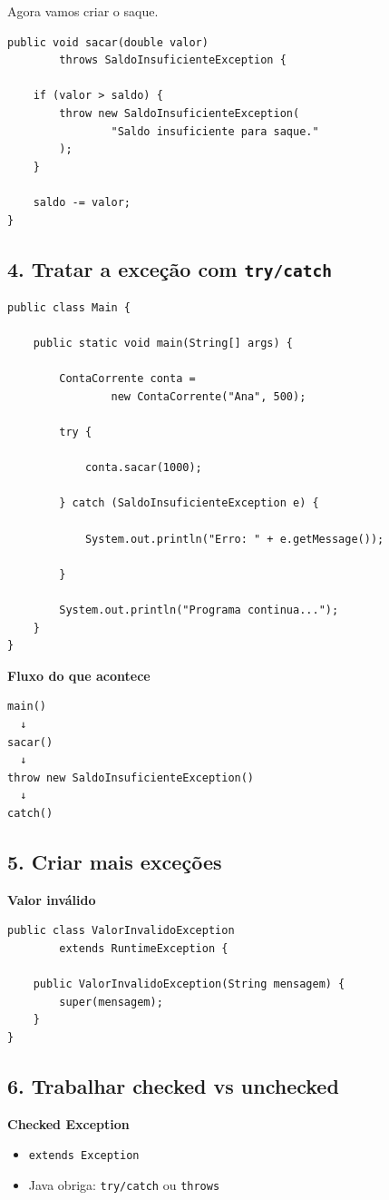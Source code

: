 \documentclass[12pt,a4paper]{article}
\begin{document}
Agora vamos criar o saque.

\begin{lstlisting}
public void sacar(double valor)
        throws SaldoInsuficienteException {

    if (valor > saldo) {
        throw new SaldoInsuficienteException(
                "Saldo insuficiente para saque."
        );
    }

    saldo -= valor;
}
\end{lstlisting}

\subsection*{4. Tratar a exceção com \texttt{try/catch}}
\begin{lstlisting}
public class Main {

    public static void main(String[] args) {

        ContaCorrente conta =
                new ContaCorrente("Ana", 500);

        try {

            conta.sacar(1000);

        } catch (SaldoInsuficienteException e) {

            System.out.println("Erro: " + e.getMessage());

        }

        System.out.println("Programa continua...");
    }
}
\end{lstlisting}

\textbf{Fluxo do que acontece}
\begin{verbatim}
main()
  ↓
sacar()
  ↓
throw new SaldoInsuficienteException()
  ↓
catch()
\end{verbatim}

\subsection*{5. Criar mais exceções}
\textbf{Valor inválido}
\begin{lstlisting}
public class ValorInvalidoException
        extends RuntimeException {

    public ValorInvalidoException(String mensagem) {
        super(mensagem);
    }
}
\end{lstlisting}

\subsection*{6. Trabalhar checked vs unchecked}
\textbf{Checked Exception}
\begin{itemize}
    \item \texttt{extends Exception}
    \item Java obriga: \texttt{try/catch} ou \texttt{throws}
\end{itemize}
\end{document}
